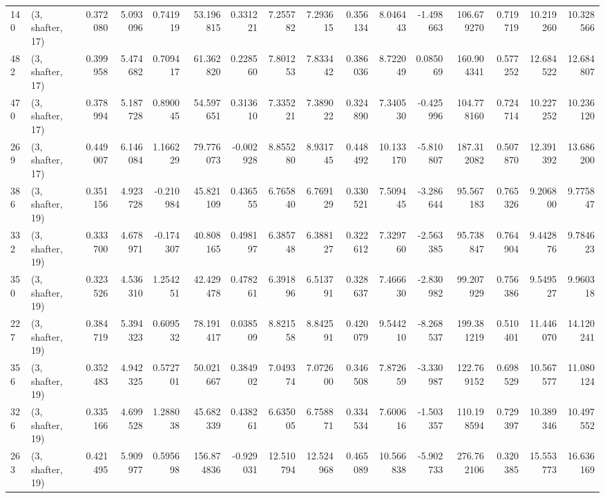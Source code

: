 \begin{tabular}{llrrrrrrrrrrrrrr}
140 &  (3, shafter, 17) &   0.372080 &   5.093096 &   0.741919 &    53.196815 &   0.331221 &   7.255782 &   7.293615 &  0.356134 &   8.046443 &  -1.498663 &   106.679270 &   0.719719 &  10.219260 &  10.328566 \\
482 &  (3, shafter, 17) &   0.399958 &   5.474682 &   0.709417 &    61.362820 &   0.228560 &   7.801253 &   7.833442 &  0.386036 &   8.722049 &   0.085069 &   160.904341 &   0.577252 &  12.684522 &  12.684807 \\
470 &  (3, shafter, 17) &   0.378994 &   5.187728 &   0.890045 &    54.597651 &   0.313610 &   7.335221 &   7.389022 &  0.324890 &   7.340530 &  -0.425996 &   104.778160 &   0.724714 &  10.227252 &  10.236120 \\
269 &  (3, shafter, 17) &   0.449007 &   6.146084 &   1.166229 &    79.776073 &  -0.002928 &   8.855280 &   8.931745 &  0.448492 &  10.133170 &  -5.810807 &   187.312082 &   0.507870 &  12.391392 &  13.686200 \\
386 &  (3, shafter, 19) &   0.351156 &   4.923728 &  -0.210984 &    45.821109 &   0.436555 &   6.765840 &   6.769129 &  0.330521 &   7.509445 &  -3.286644 &    95.567183 &   0.765326 &   9.206800 &   9.775847 \\
332 &  (3, shafter, 19) &   0.333700 &   4.678971 &  -0.174307 &    40.808165 &   0.498197 &   6.385748 &   6.388127 &  0.322612 &   7.329760 &  -2.563385 &    95.738847 &   0.764904 &   9.442876 &   9.784623 \\
350 &  (3, shafter, 19) &   0.323526 &   4.536310 &   1.254251 &    42.429478 &   0.478261 &   6.391896 &   6.513791 &  0.328637 &   7.466630 &  -2.830982 &    99.207929 &   0.756386 &   9.549527 &   9.960318 \\
227 &  (3, shafter, 19) &   0.384719 &   5.394323 &   0.609532 &    78.191417 &   0.038509 &   8.821558 &   8.842591 &  0.420079 &   9.544210 &  -8.268537 &   199.381219 &   0.510401 &  11.446070 &  14.120241 \\
356 &  (3, shafter, 19) &   0.352483 &   4.942325 &   0.572701 &    50.021667 &   0.384902 &   7.049374 &   7.072600 &  0.346508 &   7.872659 &  -3.330987 &   122.769152 &   0.698529 &  10.567577 &  11.080124 \\
326 &  (3, shafter, 19) &   0.335166 &   4.699528 &   1.288038 &    45.682339 &   0.438261 &   6.635005 &   6.758871 &  0.334534 &   7.600616 &  -1.503357 &   110.198594 &   0.729397 &  10.389346 &  10.497552 \\
263 &  (3, shafter, 19) &   0.421495 &   5.909977 &   0.595698 &   156.874836 &  -0.929031 &  12.510794 &  12.524968 &  0.465089 &  10.566838 &  -5.902733 &   276.762106 &   0.320385 &  15.553773 &  16.636169 \\

\end{tabular}
